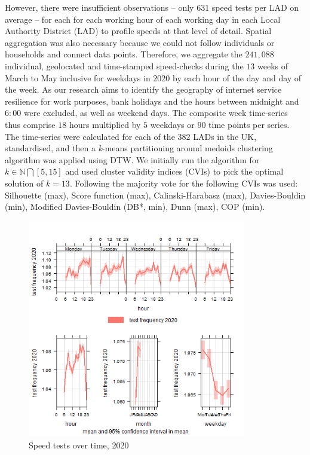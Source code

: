 \documentclass[]{interact}
\theoremstyle{plain}%
\theoremstyle{definition}
\theoremstyle{remark}
\begin{document}
However, there were insufficient observations -- only \(631\) speed
tests per LAD on average -- for each for each working hour of each
working day in each Local Authority District (LAD) to profile speeds at
that level of detail. Spatial aggregation was also necessary because we
could not follow individuals or households and connect data points.
Therefore, we aggregate the \(241,088\) individual, geolocated and
time-stamped speed-checks during the \(13\) weeks of March to May
inclusive for weekdays in \(2020\) by each hour of the day and day of
the week. As our research aims to identify the geography of internet
service resilience for work purposes, bank holidays and the hours
between midnight and \(6:00\) were excluded, as well as weekend days.
The composite week time-series thus comprise \(18\) hours multiplied by
\(5\) weekdays or \(90\) time points per series. The time-series were
calculated for each of the \(382\) LADs in the UK, standardised, and
then a \emph{k}-means partitioning around medoids clustering algorithm
was applied using DTW. We initially run the algorithm for
\(k \in \mathbb{N} \bigcap [5,15]\) and used cluster validity indices
(CVIs) to pick the optimal solution of \(k = 13\). Following
\citet{sardatime} the majority vote for the following CVIs was used:
Silhouette (max), Score function (max), Calinski-Harabasz (max),
Davies-Bouldin (min), Modified Davies-Bouldin (DB*, min), Dunn (max),
COP (min).

\begin{figure}
\centering
\includegraphics[width=0.85\textwidth,height=0.5\textheight]{figures/time.var.plot2020.png}
\caption{Speed tests over time, 2020 \label{test2020}}
\end{figure}
\end{document}
